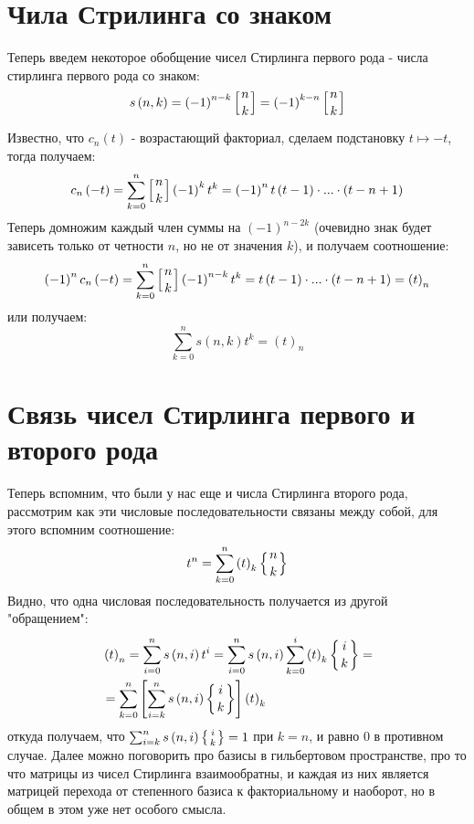 \section{Чила Стрилинга со знаком}

Теперь введем некоторое обобщение чисел Стирлинга первого рода - числа стирлинга первого рода со знаком:
\[
	s\left(n,k\right) = \left(-1\right)^{n-k} \left[n\atop k\right] = \left(-1\right)^{k-n} \left[n\atop k\right]
\]

Известно, что $c_n\left(t\right)$ - возрастающий факториал, сделаем подстановку $t \mapsto -t$, тогда получаем:
\[
	c_n\left(-t\right) = \sum_{k=0}^n \left[n\atop k\right] \left(-1\right)^k t^k = \left(-1\right)^n t \left(t-1\right)\cdot ... \cdot\left(t-n+1\right)
\]
Теперь домножим каждый член суммы на $\left(-1\right)^{n-2k}$ (очевидно знак будет зависеть только от четности $n$, но не от значения $k$), и получаем соотношение:
\[
	\left(-1\right)^n c_n\left(-t\right) = \sum_{k=0}^{n} \left[n\atop k\right] \left(-1\right)^{n-k} t^k = t\left(t-1\right)\cdot ... \cdot\left(t-n+1\right) = \left(t\right)_n
\]
или получаем:
\[
	\sum_{k=0}^n s\left(n,k\right) t^k = \left(t\right)_n
\]

\section{Связь чисел Стирлинга первого и второго рода}

Теперь вспомним, что были у нас еще и числа Стирлинга второго рода, рассмотрим как эти числовые последовательности связаны между собой, для этого вспомним соотношение:
\[
	t^n = \sum_{k=0}^n \left(t\right)_k \left\{{{n}\atop{k}}\right\}
\]
Видно, что одна числовая последовательность получается из другой "обращением":
\[
	\begin{split}
		& \left(t\right)_n = \sum_{i=0}^n s\left(n,i\right)t^i = \sum_{i=0}^ns\left(n,i\right) \sum_{k=0}^i\left(t\right)_k\left\{{{i}\atop{k}}\right\} =\\
		& = \sum_{k=0}^n \left[\sum_{i=k}^n s\left(n,i\right)\left\{{{i}\atop{k}}\right\} \right] \left(t\right)_k
	\end{split}
\]
откуда получаем, что $\sum_{i=k}^n s\left(n,i\right)\left\{{{i}\atop{k}}\right\} = 1$ при $k=n$, и равно 0 в противном случае. Далее можно поговорить про базисы в гильбертовом пространстве, про то что матрицы из чисел Стирлинга взаимообратны, и каждая из них является матрицей перехода от степенного базиса к факториальному и наоборот, но в общем в этом уже нет особого смысла.
